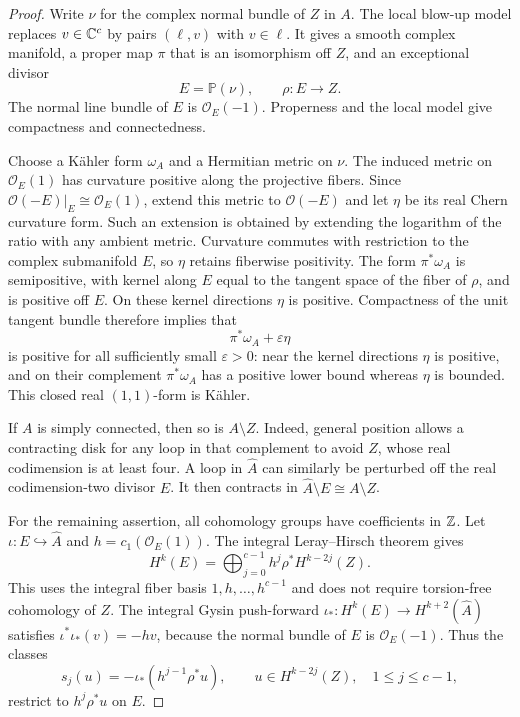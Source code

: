 \begin{proof}
Write $\nu$ for the complex normal bundle of $Z$ in $A$. The local
blow-up model replaces $v\in\mathbb C^c$ by pairs $(\ell,v)$ with
$v\in\ell$. It gives a smooth complex manifold, a proper map $\pi$
that is an isomorphism off $Z$, and an exceptional divisor
\[
 E=\mathbb P(\nu),\qquad \rho:E\to Z.
\]
The normal line bundle of $E$ is $\mathcal O_E(-1)$. Properness and
the local model give compactness and connectedness.

Choose a K\"ahler form $\omega_A$ and a Hermitian metric on $\nu$.
The induced metric on $\mathcal O_E(1)$ has curvature positive along
the projective fibers. Since
$\mathcal O(-E)|_E\cong\mathcal O_E(1)$, extend this metric to
$\mathcal O(-E)$ and let $\eta$ be its real Chern curvature form.
Such an extension is obtained by extending the logarithm of the ratio
with any ambient metric. Curvature commutes with restriction to the
complex submanifold $E$, so $\eta$ retains fiberwise positivity.
The form $\pi^*\omega_A$ is semipositive, with kernel along $E$
equal to the tangent space of the fiber of $\rho$, and is positive
off $E$. On these kernel directions $\eta$ is positive. Compactness
of the unit tangent bundle therefore implies that
\[
 \pi^*\omega_A+\varepsilon\eta
\]
is positive for all sufficiently small $\varepsilon>0$: near the
kernel directions $\eta$ is positive, and on their complement
$\pi^*\omega_A$ has a positive lower bound whereas $\eta$ is bounded.
This closed real $(1,1)$-form is K\"ahler.

If $A$ is simply connected, then so is $A\setminus Z$. Indeed,
general position allows a contracting disk for any loop in that
complement to avoid $Z$, whose real codimension is at least four.
A loop in $\widehat A$ can similarly be perturbed off the real
codimension-two divisor $E$. It then contracts in
$\widehat A\setminus E\cong A\setminus Z$.

For the remaining assertion, all cohomology groups have coefficients
in $\mathbb Z$. Let $\iota:E\hookrightarrow\widehat A$ and
$h=c_1(\mathcal O_E(1))$. The integral Leray--Hirsch theorem gives
\begin{equation}
\label{geo:projective-bundle}
 H^k(E)=\bigoplus_{j=0}^{c-1}h^j\rho^*H^{k-2j}(Z).
\end{equation}
This uses the integral fiber basis $1,h,\ldots,h^{c-1}$ and does not
require torsion-free cohomology of $Z$. The integral Gysin push-forward
$\iota_*:H^k(E)\to H^{k+2}(\widehat A)$ satisfies
$\iota^*\iota_*(v)=-hv$, because the normal bundle of $E$ is
$\mathcal O_E(-1)$. Thus the classes
\[
 s_j(u)=-\iota_*(h^{j-1}\rho^*u),
 \qquad u\in H^{k-2j}(Z),\quad 1\leq j\leq c-1,
\]
restrict to $h^j\rho^*u$ on $E$.


\end{proof}
